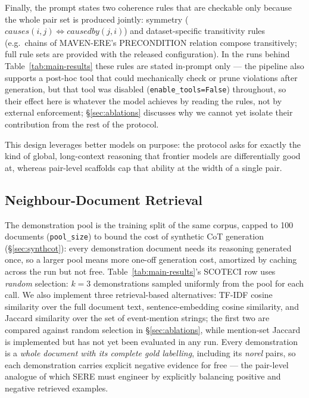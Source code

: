 \documentclass[11pt]{article}
\newcommand{\method}{SCOTECI}
\begin{document}
Finally, the prompt states two coherence rules that are checkable only because the
whole pair set is produced jointly: symmetry
($\textit{causes}(i,j) \Leftrightarrow \textit{causedby}(j,i)$) and
dataset-specific transitivity rules (e.g.\ chains of MAVEN-ERE's
\textsc{PRECONDITION} relation compose transitively; full rule sets are provided
with the released configuration). In the runs behind Table~\ref{tab:main-results}
these rules are stated in-prompt only --- the pipeline also supports a post-hoc
tool that could mechanically check or prune violations after generation, but that
tool was disabled (\texttt{enable\_tools=False}) throughout, so their effect here
is whatever the model achieves by reading the rules, not by external enforcement;
\S\ref{sec:ablations} discusses why we cannot yet isolate their contribution from
the rest of the protocol.

This design leverages better models on purpose: the protocol asks for exactly the
kind of global, long-context reasoning that frontier models are differentially good
at, whereas pair-level scaffolds cap that ability at the width of a single pair.

\subsection{Neighbour-Document Retrieval}
\label{sec:retrieval}
The demonstration pool is the training split of the same corpus, capped to 100
documents (\texttt{pool\_size}) to bound the cost of synthetic CoT generation
(\S\ref{sec:synthcot}): every demonstration document needs its reasoning generated
once, so a larger pool means more one-off generation cost, amortized by caching
across the run but not free. Table~\ref{tab:main-results}'s \method{} row uses
\emph{random} selection: $k=3$ demonstrations sampled uniformly from the pool for
each call. We also implement three retrieval-based alternatives: TF-IDF cosine
similarity over the full document text, sentence-embedding cosine similarity, and
Jaccard similarity over the set of event-mention strings; the first two are
compared against random selection in \S\ref{sec:ablations}, while mention-set
Jaccard is implemented but has not yet been evaluated in any run. Every
demonstration is a \emph{whole document with its complete gold labelling},
including its \textit{norel} pairs, so each demonstration carries explicit negative
evidence for free --- the pair-level analogue of which SERE must engineer by
explicitly balancing positive and negative retrieved examples.
\end{document}
